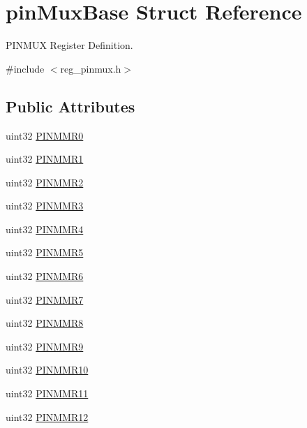 \hypertarget{structpinMuxBase}{}\section{pin\+Mux\+Base Struct Reference}
\label{structpinMuxBase}


P\+I\+N\+M\+UX Register Definition.  




{\ttfamily \#include $<$reg\+\_\+pinmux.\+h$>$}

\subsection*{Public Attributes}
\begin{DoxyCompactItemize}
\item 
uint32 \mbox{\hyperlink{structpinMuxBase_a5b72df26e548e7eab5e2adbfef85ebda}{P\+I\+N\+M\+M\+R0}}
\item 
uint32 \mbox{\hyperlink{structpinMuxBase_ae365059d897a6eeb77f969ede5651df1}{P\+I\+N\+M\+M\+R1}}
\item 
uint32 \mbox{\hyperlink{structpinMuxBase_a4c4b94f7fb564ddf5e7e55b30c4dac99}{P\+I\+N\+M\+M\+R2}}
\item 
uint32 \mbox{\hyperlink{structpinMuxBase_ac8e1e167da6fe7be6f80eccb854c1931}{P\+I\+N\+M\+M\+R3}}
\item 
uint32 \mbox{\hyperlink{structpinMuxBase_abb42ec3db2941d698635be481e945c08}{P\+I\+N\+M\+M\+R4}}
\item 
uint32 \mbox{\hyperlink{structpinMuxBase_ade4675e7bdf64172fbc00436b24a9323}{P\+I\+N\+M\+M\+R5}}
\item 
uint32 \mbox{\hyperlink{structpinMuxBase_a026fd6b8134b125e845278080b6887bd}{P\+I\+N\+M\+M\+R6}}
\item 
uint32 \mbox{\hyperlink{structpinMuxBase_ac99df9383a0798ca780da5ef63137bed}{P\+I\+N\+M\+M\+R7}}
\item 
uint32 \mbox{\hyperlink{structpinMuxBase_a0e23d2591f33897f2c60247cdb7a3e77}{P\+I\+N\+M\+M\+R8}}
\item 
uint32 \mbox{\hyperlink{structpinMuxBase_a74b13c419d66022d6de6216a6444be1e}{P\+I\+N\+M\+M\+R9}}
\item 
uint32 \mbox{\hyperlink{structpinMuxBase_af5c8dcc8b70f427ad69423407f876f96}{P\+I\+N\+M\+M\+R10}}
\item 
uint32 \mbox{\hyperlink{structpinMuxBase_aa4a006a33f6f94266f7b4e640d1dcf19}{P\+I\+N\+M\+M\+R11}}
\item 
uint32 \mbox{\hyperlink{structpinMuxBase_a303001b277700613386c7fbb224ddc0f}{P\+I\+N\+M\+M\+R12}}

\end{DoxyCompactItemize}

